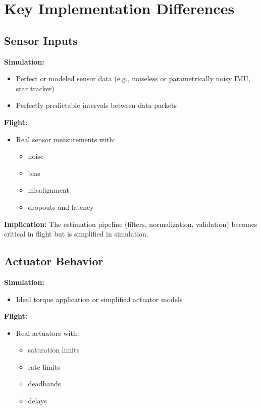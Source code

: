 \section{Key Implementation Differences}

\subsection{Sensor Inputs}

\textbf{Simulation:}
\begin{itemize}
	\item Perfect or modeled sensor data (e.g., noiseless or parametrically noisy IMU, star tracker)
	\item Perfectly predictable intervals between data packets
\end{itemize}

\textbf{Flight:}
\begin{itemize}
	\item Real sensor measurements with:
	\begin{itemize}
		\item noise
		\item bias
		\item misalignment
		\item dropouts and latency
	\end{itemize}
\end{itemize}

\textbf{Implication:}  
The estimation pipeline (filters, normalization, validation) becomes critical in flight but is simplified in simulation.

\subsection{Actuator Behavior}

\textbf{Simulation:}
\begin{itemize}
	\item Ideal torque application or simplified actuator models
\end{itemize}

\textbf{Flight:}
\begin{itemize}
	\item Real actuators with:
	\begin{itemize}
		\item saturation limits
		\item rate limits
		\item deadbands
		\item delays
	\end{itemize}
\end{itemize}

